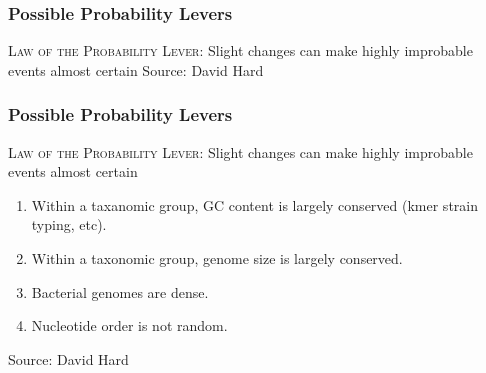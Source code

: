 \documentclass[10pt, compress]{beamer}
\begin{document}
\begin{frame}[fragile]
  \frametitle{Possible Probability Levers}
    {\small\textsc{Law of the Probability Lever}: \footnotesize{Slight changes can make highly improbable events almost certain}}
\vskip 40mm
{\tiny Source: David Hard}
\end{frame}

\begin{frame}[fragile]
  \frametitle{Possible Probability Levers}
    {\small\textsc{Law of the Probability Lever}: \footnotesize{Slight changes can make highly improbable events almost certain}}
  \begin{enumerate}[<+- | alert@+>]
  \item Within a taxanomic group, GC content is largely conserved (kmer strain typing, etc).
\item Within a taxonomic group, genome size is largely conserved.
\item Bacterial genomes are dense.
\item Nucleotide order is not random.
\end{enumerate}
\vfill
{\tiny Source: David Hard}
\end{frame}


\end{document}

